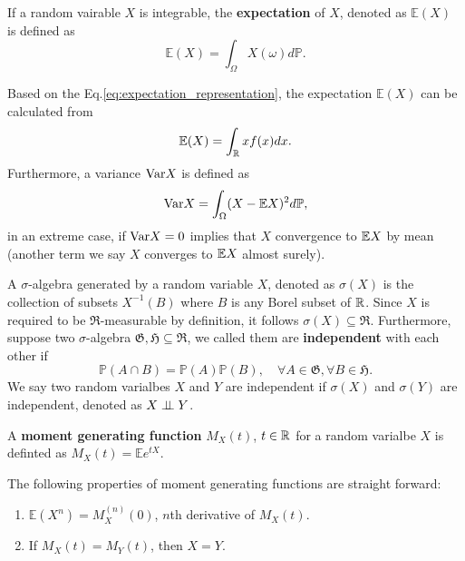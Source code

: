 \begin{definition}
If a random vairable $X$ is integrable, the \textbf{expectation} of $X$, denoted as $\mathbb{E}(X)$ is defined as
	\begin{equation}
	\mathbb{E}(X)=\int_{\Omega}X(\omega) d\mathbb{P}.
	\end{equation}
\end{definition}
Based on the Eq.\ref{eq:expectation_representation}, the expectation $\mathbb{E}(X)$ can be calculated from
\begin{equation}
\mathbb{E}(X)=\int_{\mathbb{R}} xf(x)dx.
\end{equation}
Furthermore, a variance $\text{Var} X$ is defined as
\begin{equation}
\text{Var} X=\int_\Omega (X-\mathbb{E} X)^2d\mathbb{P},
\end{equation}
in an extreme case, if $\text{Var} X=0$ implies that $X$ convergence to $\mathbb{E} X$ by mean (another term we say $X$ converges to $\mathbb{E} X$ almost surely).

\begin{definition}
A $\sigma$-algebra generated by a random variable $X$, denoted as $\sigma(X)$ is the collection of subsets $X^{-1}(B)$ where $B$ is any Borel subset of $\mathbb{R}$. Since $X$ is required to be $\mathfrak{R}$-measurable by definition, it follows $\sigma(X)\subseteq\mathfrak{R}$. Furthermore, suppose two $\sigma$-algebra $\mathfrak{G,H}\subseteq\mathfrak{R}$, we called them are \textbf{independent} with each other if
	\begin{equation}
	\mathbb{P}(A\cap B)=\mathbb{P}(A)\mathbb{P}(B),\quad \forall A\in\mathfrak{G}, \forall B\in\mathfrak{H}.
	\label{eq:def_independence}
	\end{equation}
We say two random varialbes $X$ and $Y$ are independent if $\sigma(X)$ and $\sigma(Y)$ are independent, denoted as $X\perp\!\!\!\perp Y$.
\end{definition}

\begin{definition}
A \textbf{moment generating function} $M_X(t)$, $t\in\mathbb{R}$ for a random varialbe $X$ is definted as $M_X(t)=\mathbb{E}e^{tX}$.
\end{definition}

\begin{theorem}
The following properties of moment generating functions are straight forward:
	\begin{enumerate}
	\item $\mathbb{E}(X^n)=M_X^{(n)}(0)$, $n$th derivative of $M_X(t)$.
	\item If $M_X(t)=M_Y(t)$, then $X=Y$.
	\end{enumerate}
	\label{th:mgf}
\end{theorem}



